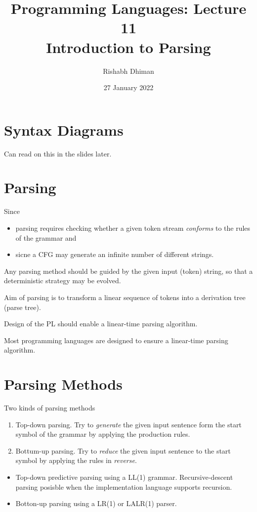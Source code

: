 \documentclass[a4paper]{scrartcl}
\title{
	Programming Languages: Lecture 11\\
	Introduction to Parsing
}
\author{Rishabh Dhiman}
\date{27 January 2022}
\theoremstyle{definition}
\begin{document}
\maketitle

\section{Syntax Diagrams}
Can read on this in the slides later.

\section{Parsing}
Since
\begin{itemize}
	\item parsing requires checking whether a given token stream \emph{conforms} to the rules of the grammar and
	\item sicne a CFG may generate an infinite number of different strings.
\end{itemize}
Any parsing method should be guided by the given input (token) string, so that a deterministic strategy may be evolved.

Aim of parsing is to transform a linear sequence of tokens into a derivation tree (parse tree).

Design of the PL should enable a linear-time parsing algorithm.

Most programming languages are designed to ensure a linear-time parsing algorithm.

\section{Parsing Methods}
Two kinds of parsing methods
\begin{enumerate}
	\item Top-down parsing. Try to \emph{generate} the given input sentence form the start symbol of the grammar by applying the production rules.
	\item Bottum-up parsing. Try to \emph{reduce} the given input sentence to the start symbol by applying the rules in \emph{reverse}.
\end{enumerate}

\begin{itemize}
	\item Top-down predictive parsing using a LL(1) grammar. Recursive-descent parsing posisble when the implementation language supports recursion.
	\item Botton-up parsing using a LR(1) or LALR(1) parser.
\end{itemize}
\end{document}

